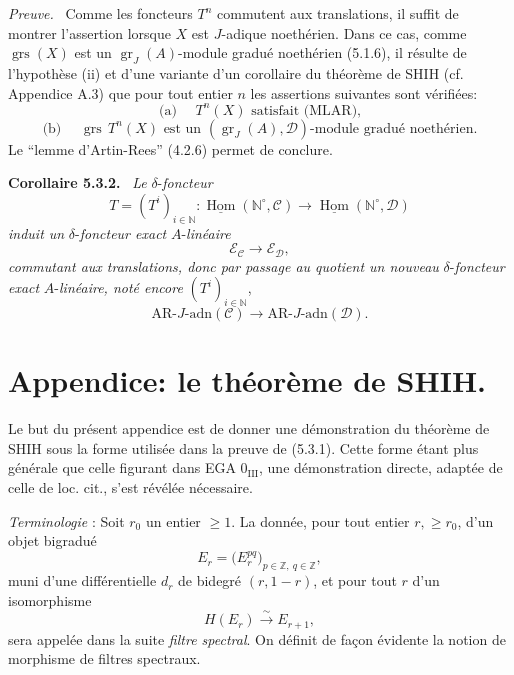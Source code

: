\documentclass[11pt]{article}
\newenvironment{statement}[1]{\par\medskip\noindent\textbf{#1.}\ }{\par\medskip}
\newenvironment{prooftext}[1][Proof]{\par\noindent\emph{#1.}\ }{\par\medskip}
\DeclareMathOperator{\Hom}{Hom}
\providecommand{\uHom}{\underline{\Hom}}
\providecommand{\gr}{\operatorname{gr}}
\providecommand{\Hom}{\operatorname{Hom}}
\providecommand{\gr}{\operatorname{gr}}
\providecommand{\gr}{\operatorname{gr}}
\providecommand{\grs}{\operatorname{grs}}
\providecommand{\Hom}{\operatorname{Hom}}
\begin{document}
\begin{prooftext}[Preuve]
Comme les foncteurs \(T^n\) commutent aux translations, il suffit de montrer l'assertion lorsque \(X\) est \(J\)-adique noethérien. Dans ce cas, comme \(\grs(X)\) est un \(\gr_J(A)\)-module gradué noethérien (5.1.6), il résulte de l'hypothèse (ii) et d'une variante d'un corollaire du théorème de SHIH (cf. Appendice A.3) que pour tout entier \(n\) les assertions suivantes sont vérifiées:
\[
\text{(a) }\quad T^n(X)\text{ satisfait (MLAR),}
\]
\[
\text{(b) }\quad \grs\,T^n(X)\text{ est un }(\gr_J(A),\mathcal D)\text{-module gradué noethérien.}
\]
Le ``lemme d'Artin-Rees'' (4.2.6) permet de conclure.
\end{prooftext}

\begin{statement}{Corollaire 5.3.2}
\emph{Le} \(\delta\)-\emph{foncteur}
\[
T=(T^i)_{i\in\mathbb N}:\uHom(\mathbb N^\circ,\mathcal C)\longrightarrow\uHom(\mathbb N^\circ,\mathcal D)
\]
\emph{induit un} \(\delta\)-\emph{foncteur exact} \(A\)-\emph{linéaire}
\[
\mathcal E_{\mathcal C}\longrightarrow\mathcal E_{\mathcal D},
\]
\emph{commutant aux translations, donc par passage au quotient un nouveau} \(\delta\)-\emph{foncteur exact} \(A\)-\emph{linéaire, noté encore} \((T^i)_{i\in\mathbb N}\),
\[
\mathrm{AR}\text{-}J\text{-adn}(\mathcal C)\longrightarrow
\mathrm{AR}\text{-}J\text{-adn}(\mathcal D).
\]
\end{statement}

\section*{Appendice: le théorème de SHIH.}

Le but du présent appendice est de donner une démonstration du théorème de SHIH sous la forme utilisée dans la preuve de (5.3.1). Cette forme étant plus générale que celle figurant dans EGA \(0_{\mathrm{III}}\), une démonstration directe, adaptée de celle de loc. cit., s'est révélée nécessaire.

\emph{Terminologie} : Soit \(r_0\) un entier \(\ge1\). La donnée, pour tout entier \(r,\ge r_0\), d'un objet bigradué
\[
E_r=\bigl(E_r^{pq}\bigr)_{p\in\mathbb Z,\ q\in\mathbb Z},
\]
muni d'une différentielle \(d_r\) de bidegré \((r,1-r)\), et pour tout \(r\) d'un isomorphisme
\[
H(E_r)\xrightarrow{\sim}E_{r+1},
\]
sera appelée dans la suite \emph{filtre spectral}. On définit de façon évidente la notion de morphisme de filtres spectraux.
\end{document}
